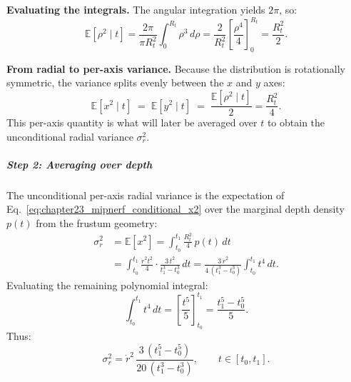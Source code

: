 \begin{enrichment}
\begin{enrichment}
    \noindent
    \textbf{Evaluating the integrals.}  
    The angular integration yields $2\pi$, so:
    \[
    \mathbb{E}[\rho^2 \mid t]
    = \frac{2\pi}{\pi R_t^2} \int_{0}^{R_t} \rho^3 \, d\rho
    = \frac{2}{R_t^2} \left[ \frac{\rho^4}{4} \right]_{0}^{R_t}
    = \frac{R_t^2}{2}.
    \]
    
    \noindent
    \textbf{From radial to per-axis variance.}  
    Because the distribution is rotationally symmetric, the variance splits evenly between the $x$ and $y$ axes:
    \begin{equation}
        \mathbb{E}[x^2 \mid t] 
        \;=\; \mathbb{E}[y^2 \mid t] 
        \;=\; \frac{\mathbb{E}[\rho^2 \mid t]}{2}
        = \frac{R_t^2}{4}.
        \label{eq:chapter23_mipnerf_conditional_x2}
    \end{equation}
    This per-axis quantity is what will later be averaged over $t$ to obtain the unconditional radial variance $\sigma_r^2$.
    
    \subparagraph{Step 2: Averaging over depth}  
    The unconditional per-axis radial variance is the expectation of Eq.~\ref{eq:chapter23_mipnerf_conditional_x2} over the marginal depth density $p(t)$ from the frustum geometry:
    \begin{align}
        \sigma_r^2
        &= \mathbb{E}[x^2]
        = \int_{t_0}^{t_1} \frac{R_t^2}{4} \, p(t) \, dt \\
        &= \int_{t_0}^{t_1} \frac{\dot{r}^2 t^2}{4} \cdot \frac{3\,t^2}{t_1^3 - t_0^3} \, dt
        = \frac{3\,\dot{r}^2}{4\,(t_1^3 - t_0^3)} \int_{t_0}^{t_1} t^4 \, dt.
    \end{align}
    Evaluating the remaining polynomial integral:
    \[
    \int_{t_0}^{t_1} t^4 \, dt
    = \left[ \frac{t^5}{5} \right]_{t_0}^{t_1}
    = \frac{t_1^5 - t_0^5}{5}.
    \]
    Thus:
    \begin{equation}
        \sigma_r^2
        = \dot{r}^2 \, \frac{3\,(t_1^5 - t_0^5)}{20\,(t_1^3 - t_0^3)}, 
        \qquad t \in [t_0, t_1].
        \label{eq:chapter23_mipnerf_sigma_r2}
    \end{equation}
    

\end{enrichment}
\end{enrichment}

